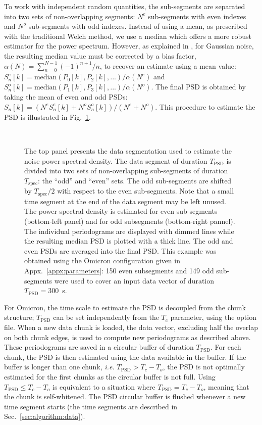 To work with independent random quantities, the sub-segments are separated into two sets of non-overlapping segments: $N^e$ sub-segments with even indexes and $N^o$ sub-segments with odd indexes. Instead of using a mean, as prescribed with the traditional Welch method, we use a median which offers a more robust estimator for the power spectrum. However, as explained in \cite{Allen:2005fk}, for Gaussian noise, the resulting median value must be corrected by a bias factor, $\alpha(N)=\sum_{n=0}^{N-1}{(-1)^{n+1}/n}$, to recover an estimate using a mean value: $S_n^e[k]=\mathrm{median}(P_0[k], P_2[k],...)/\alpha(N^e)$ and $S_n^o[k]=\mathrm{median}(P_1[k], P_3[k],...)/\alpha(N^o)$. The final PSD is obtained by taking the mean of even and odd PSDs: $S_n[k]=(N^eS_n^e[k]+N^oS_n^o[k])/(N^e+N^o)$. This procedure to estimate the PSD is illustrated in Fig.~\ref{fig:psdseg}.
\begin{figure}
  \center
   \\
  \caption{The top panel presents the data segmentation used to estimate the noise power spectral density. The data segment of duration $T_\mathrm{PSD}$ is divided into two sets of non-overlapping sub-segments of duration $T_\mathrm{spec}$: the ``odd'' and ``even'' sets. The odd sub-segments are shifted by $T_\mathrm{spec}/2$ with respect to the even sub-segments. Note that a small time segment at the end of the data segment may be left unused. The power spectral density is estimated for even sub-segments (bottom-left panel) and for odd subsegments (bottom-right pannel). The individual periodograms are displayed with dimmed lines while the resulting median PSD is plotted with a thick line. The odd and even PSDs are averaged into the final PSD. This example was obtained using the Omicron configuration given in Appx.~\ref{appx:parameters}: 150 even subsegments and 149 odd sub-segments were used to cover an input data vector of duration $T_\mathrm{PSD}=300$~s.}
  \label{fig:psdseg}
\end{figure}

For Omicron, the time scale to estimate the PSD is decoupled from the chunk structure; $T_\mathrm{PSD}$ can be set independently from the $T_c$ parameter, using the option file. When a new data chunk is loaded, the data vector, excluding half the overlap on both chunk edges, is used to compute new periodograms as described above. These periodograms are saved in a circular buffer of duration $T_\mathrm{PSD}$. For each chunk, the PSD is then estimated using the data available in the buffer. If the buffer is longer than one chunk, \textit{i.e.} $T_\mathrm{PSD} > T_c-T_o$, the PSD is not optimally estimated for the first chunks as the circular buffer is not full. Using $T_\mathrm{PSD} \le T_c-T_o$ is equivalent to a situation where $T_\mathrm{PSD} = T_c-T_o$, meaning that the chunk is self-whitened. The PSD circular buffer is flushed whenever a new time segment starts (the time segments are described in Sec.~\ref{sec:algorithm:data}). 

